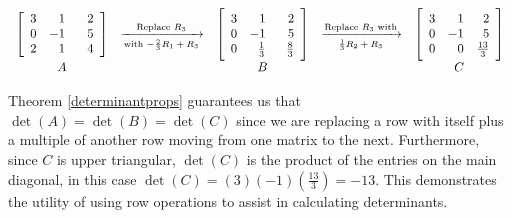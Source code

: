 \[ \begin{array}{ccccc}

\left[ \begin{array}{rrr} 
3 &  1 & \hphantom{-}2 \\ 
0 & -1 & 5 \\ 
2 & 1 & 4 \\ 
\end{array} \right]

&
\xrightarrow[\text{with $-\frac{2}{3}R_1+R_3$}]{\text{Replace $R_3$}}
&

\left[ \begin{array}{rrr} 
3 &  1 & \hphantom{-}2 \\ 
0 & -1 & 5 \\
0 & \frac{1}{3} & \frac{8}{3} \\ 
\end{array} \right]
&
\xrightarrow[\text{$\frac{1}{3}R_2+R_3$}]{\text{Replace $R_3$ with}}
&

\left[ \begin{array}{rrr} 
3 &  1 & 2 \\ 
0 & -1 & 5 \\
0 & 0 & \frac{13}{3} \\ 
\end{array} \right] \\

A & & B & & C \\

\end{array}\]

Theorem \ref{determinantprops} guarantees us that $\det(A) = \det(B) = \det(C)$ since we are replacing a row with itself plus a multiple of another row moving from one matrix to the next.  Furthermore, since $C$ is upper triangular, $\det(C)$ is the product of the entries on the main diagonal, in this case  $\det(C) = (3)(-1)\left(\frac{13}{3}\right) = -13$.  This demonstrates the utility of using row operations to assist in calculating determinants.  





